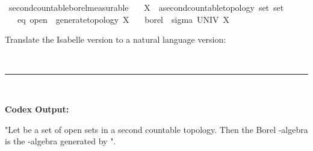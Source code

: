 \documentclass{article}
\begin{document}
\begin{boxB}
\begin{isabelle}
\isamarkupfalse \ second{\isacharunderscore}{\kern0pt}countable{\isacharunderscore}{\kern0pt}borel{\isacharunderscore}{\kern0pt}measurable{\isacharcolon}{\kern0pt}\isanewline
\ \ \ X\ {\isacharcolon}{\kern0pt}{\isacharcolon}{\kern0pt}\ {\isachardoublequoteopen}{\isacharprime}{\kern0pt}a{\isacharcolon}{\kern0pt}{\isacharcolon}{\kern0pt}second{\isacharunderscore}{\kern0pt}countable{\isacharunderscore}{\kern0pt}topology\ set\ set{\isachardoublequoteclose}\isanewline
\ \ \ eq{\isacharcolon}{\kern0pt}\ {\isachardoublequoteopen}open\ {\isacharequal}{\kern0pt}\ generate{\isacharunderscore}{\kern0pt}topology\ X{\isachardoublequoteclose}\isanewline
\ \ \ {\isachardoublequoteopen}borel\ {\isacharequal}{\kern0pt}\ sigma\ UNIV\ X{\isachardoublequoteclose}
\end{isabelle}
Translate the Isabelle version to a natural language version:

\
\hrule
\

\textbf{Codex Output:}

"Let  be a set of open sets in a second countable topology. Then the Borel -algebra is the -algebra generated by ".
\end{boxB}
\end{document}
